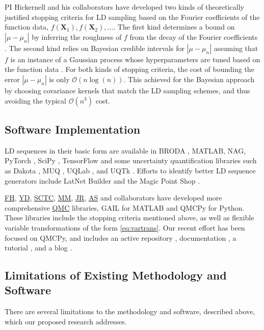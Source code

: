 \documentclass[11pt]{NSFamsart}
\newcommand{\FH}{\hyperlink{FHlink}{FH}\xspace}
\newcommand{\SCTC}{\hyperlink{SCTClink}{SCTC}\xspace}
\newcommand{\MM}{\hyperlink{MMlink}{MM}\xspace}
\newcommand{\YD}{\hyperlink{YDlink}{YD}\xspace}
\newcommand{\JR}{\hyperlink{JRlink}{JR}\xspace}
\newcommand{\AS}{\hyperlink{ASlink}{AS}\xspace}
\newcommand{\QMC}{\hyperlink{QMClink}{QMC}\xspace}
\newcommand{\QMCPy}{QMCPy\xspace}
\newcommand{\NAG}{NAG\xspace}
\newcommand{\MATLAB}{MATLAB\xspace}
\newcommand{\bX}{{\boldsymbol{X}}}
\def\abs#1{\ensuremath{\left \lvert #1 \right \rvert}}
\newcommand{\Order}{\mathcal{O}}
\begin{document}
PI Hickernell and his collaborators have developed two kinds of theoretically justified stopping criteria for LD sampling based on the Fourier coefficients of the function data, $f(\bX_1), f(\bX_2), \ldots$.  The first kind determines a bound on $\abs{\mu-\mu_n}$ by inferring the roughness of $f$ from the decay of the Fourier coefficients \cite{HicJim16a,JimHic16a,HicEtal17a}.  The second kind relies on Bayesian credible intervals for $\abs{\mu-\mu_n}$ assuming that $f$ is an instance of a Gaussian process whose hyperparameters are tuned based on the function data \cite{HicJag18b,RatHic19a,JagHic22a}. For both kinds of stopping criteria, the cost of bounding the error $\abs{\mu-\mu_n}$ is only $\Order(n \log(n))$.  This achieved for the Bayesian approach by choosing covariance kernels that match the LD sampling schemes, and thus avoiding the typical $\Order(n^3)$ cost.

\subsection{Software Implementation} LD sequences in their basic form are available in BRODA \cite{BRODA20a}, \MATLAB \cite{MAT9.9}, \NAG \cite{NAG27}, PyTorch \cite{paszke2019pytorch}, SciPy \cite{virtanen2020scipy}, TensorFlow \cite{tfqf2021a} and some uncertainty quantification libraries such as Dakota \cite{DakotaUsersManual}, MUQ \cite{MUQ}, UQLab \cite{UQLab2014,UQLab}, and UQTk \cite{DebEtal04,UQTk}.  Efforts to identify better LD sequence generators include LatNet Builder \cite{LatNet} and the Magic Point Shop \cite{Nuy17a}.  

\FH, \YD, \SCTC, \MM, \JR, \AS and collaborators have developed more comprehensive \QMC libraries, GAIL \cite{ChoEtal21a} for \MATLAB and \QMCPy \cite{QMCPy2020a} for Python.  These libraries include the stopping criteria mentioned above, as well as flexible variable transformations of the form \eqref{eq:vartrans}.  Our recent effort has been focused on \QMCPy, and includes an active repository \cite{QMCPy2020a}, documentation \cite{QMCPyDocs}, a tutorial \cite{QMCPyTutMovie2020}, and a blog \cite{QMCBlog}.


\subsection{Limitations of Existing Methodology and Software}

There are several limitations to the methodology and software, described above, which our proposed research addresses.
\end{document}
